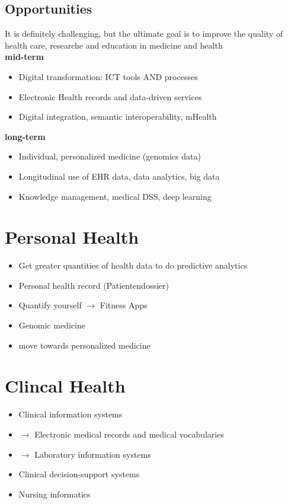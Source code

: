 \documentclass{report}
\theoremstyle{definition}
\theoremstyle{example}
\begin{document}
    \subsection{Opportunities}
    It is definitely challenging, but the ultimate goal is to improve the quality of health care, researche and education in medicine and health\\
    \textbf{mid-term}
    \begin{itemize}
       \item Digital transformation: ICT tools AND processes
       \item Electronic Health records and data-driven services
       \item Digital integration, semantic interoperability, mHealth
    \end{itemize}

    \textbf{long-term}
    \begin{itemize}
       \item Individual, personalized medicine (genomics data)
       \item Longitudinal use of EHR data, data analytics, big data
       \item Knowledge management, medical DSS, deep learning
    \end{itemize}

\section{Personal Health}
\begin{itemize}
   \item Get greater quantities of health data to do predictive analytics
   \item Personal health record (Patientendossier)
   \item Quantify yourself $\rightarrow$ Fitness Apps
   \item Genomic medicine
   \item move towards personalized medicine
\end{itemize}

\section{Clincal Health}
\begin{itemize}
   \item Clinical information systems
   \item $\rightarrow$ Electronic medical records and medical vocabularies
   \item $\rightarrow$ Laboratory information systems
   \item Clinical decision-support systems
   \item Nursing informatics
\end{itemize}
\end{document}
